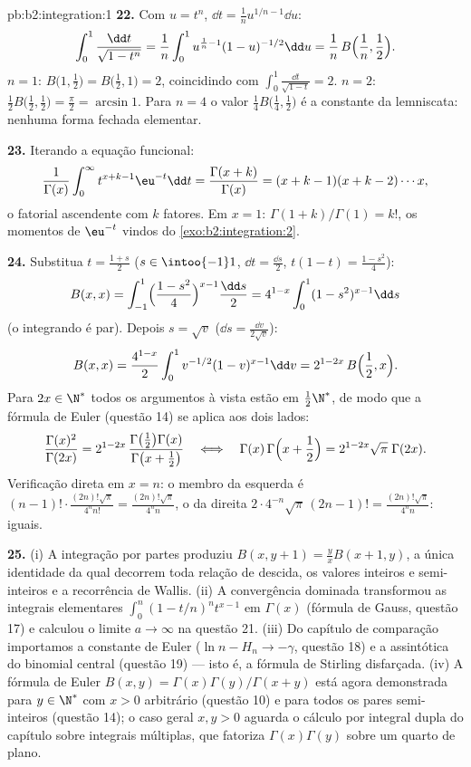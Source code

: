 \begin{solution}{pb:b2:integration:1}
\textbf{22.} Com $u = t^n$, $\dd t = \frac1n u^{1/n - 1}\dd
u$:
\[
\int_0^1 \frac{\dd t}{\sqrt{1-t^n}}
= \frac1n\int_0^1 u^{\frac1n-1}(1-u)^{-1/2}\dd u
= \frac1n\,B\Bigl(\frac1n, \frac12\Bigr) .
\]
$n = 1$: $B\bigl(1,\frac12\bigr) = B\bigl(\frac12,1\bigr) = 2$,
coincidindo com $\int_0^1\frac{\dd t}{\sqrt{1-t}} = 2$. $n = 2$:
$\frac12 B\bigl(\frac12,\frac12\bigr) = \frac\pi2 = \arcsin 1$.
Para $n = 4$ o valor $\frac14 B\bigl(\frac14,\frac12\bigr)$ é
a constante da lemniscata: nenhuma forma fechada elementar.

\textbf{23.} Iterando a equação funcional:
\[
\frac{1}{\Gamma(x)}\int_0^\infty t^{x+k-1}\eu^{-t}\dd t
= \frac{\Gamma(x+k)}{\Gamma(x)}
= (x+k-1)(x+k-2)\cdots x ,
\]
o fatorial ascendente com $k$ fatores. Em $x = 1$:
$\Gamma(1+k)/\Gamma(1) = k!$, os momentos de $\eu^{-t}$ vindos do
\cref{exo:b2:integration:2}.

\textbf{24.} Substitua $t = \frac{1+s}2$ ($s \in
\intoo{-1}1$, $\dd t = \frac{\dd s}2$, $t(1-t) =
\frac{1-s^2}4$):
\[
B(x,x) = \int_{-1}^{1}\Bigl(\frac{1-s^2}{4}\Bigr)^{x-1}
\frac{\dd s}{2}
= 4^{1-x}\int_0^1 (1-s^2)^{x-1}\dd s
\]
(o integrando é par). Depois $s = \sqrt v$ ($\dd s =
\frac{\dd v}{2\sqrt v}$):
\[
B(x,x) = \frac{4^{1-x}}{2}\int_0^1
v^{-1/2}(1-v)^{x-1}\dd v
= 2^{1-2x}\,B\Bigl(\frac12, x\Bigr) .
\]
Para $2x \in \N^*$ todos os argumentos à vista estão em
$\frac12\N^*$, de modo que a fórmula de Euler (questão 14) se aplica aos dois
lados:
\[
\frac{\Gamma(x)^2}{\Gamma(2x)}
= 2^{1-2x}\,
\frac{\Gamma\bigl(\frac12\bigr)\Gamma(x)}
{\Gamma\bigl(x+\frac12\bigr)}
\quad\Longleftrightarrow\quad
\Gamma(x)\,\Gamma\Bigl(x+\frac12\Bigr)
= 2^{1-2x}\sqrt\pi\;\Gamma(2x) .
\]
Verificação direta em $x = n$: o membro da esquerda é $(n-1)!\cdot
\frac{(2n)!\sqrt\pi}{4^n n!} = \frac{(2n)!\sqrt\pi}{4^n n}$,
o da direita $2\cdot4^{-n}\sqrt\pi\,(2n-1)! =
\frac{(2n)!\sqrt\pi}{4^n n}$: iguais.

\textbf{25.} (i) A integração por partes produziu $B(x,y+1) =
\frac yx B(x+1,y)$, a única identidade da qual decorrem toda
relação de descida, os valores inteiros e semi-inteiros e a
recorrência de Wallis. (ii) A convergência dominada transformou
as integrais elementares $\int_0^n(1-t/n)^n t^{x-1}$ em
$\Gamma(x)$ (fórmula de Gauss, questão 17) e calculou o
limite $a \to \infty$ na questão 21. (iii) Do capítulo de
comparação importamos a constante de Euler ($\ln n - H_n \to
-\gamma$, questão 18) e a assintótica do binomial central
(questão 19) --- isto é, a fórmula de Stirling disfarçada. (iv)
A fórmula de Euler $B(x,y) = \Gamma(x)\Gamma(y)/\Gamma(x+y)$ está
agora demonstrada para $y \in \N^*$ com $x > 0$ arbitrário (questão
10) e para todos os pares semi-inteiros (questão 14); o caso
geral $x, y > 0$ aguarda o cálculo por integral dupla do
capítulo sobre integrais múltiplas, que fatoriza
$\Gamma(x)\Gamma(y)$ sobre um quarto de plano.
\end{solution}
